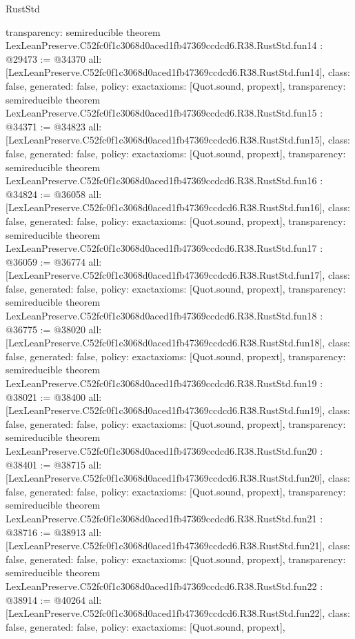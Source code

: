 \begin{lexlean}{RustStd}
\begin{coremodule}
{  transparency: semireducible
}
theorem LexLeanPreserve.C52fc0f1c3068d0aced1fb47369ccdcd6.R38.RustStd.fun14 : @29473 := @34370 {
  all: [LexLeanPreserve.C52fc0f1c3068d0aced1fb47369ccdcd6.R38.RustStd.fun14],
  class: false,
  generated: false,
  policy: exact{axioms: [Quot.sound, propext]},
  transparency: semireducible
}
theorem LexLeanPreserve.C52fc0f1c3068d0aced1fb47369ccdcd6.R38.RustStd.fun15 : @34371 := @34823 {
  all: [LexLeanPreserve.C52fc0f1c3068d0aced1fb47369ccdcd6.R38.RustStd.fun15],
  class: false,
  generated: false,
  policy: exact{axioms: [Quot.sound, propext]},
  transparency: semireducible
}
theorem LexLeanPreserve.C52fc0f1c3068d0aced1fb47369ccdcd6.R38.RustStd.fun16 : @34824 := @36058 {
  all: [LexLeanPreserve.C52fc0f1c3068d0aced1fb47369ccdcd6.R38.RustStd.fun16],
  class: false,
  generated: false,
  policy: exact{axioms: [Quot.sound, propext]},
  transparency: semireducible
}
theorem LexLeanPreserve.C52fc0f1c3068d0aced1fb47369ccdcd6.R38.RustStd.fun17 : @36059 := @36774 {
  all: [LexLeanPreserve.C52fc0f1c3068d0aced1fb47369ccdcd6.R38.RustStd.fun17],
  class: false,
  generated: false,
  policy: exact{axioms: [Quot.sound, propext]},
  transparency: semireducible
}
theorem LexLeanPreserve.C52fc0f1c3068d0aced1fb47369ccdcd6.R38.RustStd.fun18 : @36775 := @38020 {
  all: [LexLeanPreserve.C52fc0f1c3068d0aced1fb47369ccdcd6.R38.RustStd.fun18],
  class: false,
  generated: false,
  policy: exact{axioms: [Quot.sound, propext]},
  transparency: semireducible
}
theorem LexLeanPreserve.C52fc0f1c3068d0aced1fb47369ccdcd6.R38.RustStd.fun19 : @38021 := @38400 {
  all: [LexLeanPreserve.C52fc0f1c3068d0aced1fb47369ccdcd6.R38.RustStd.fun19],
  class: false,
  generated: false,
  policy: exact{axioms: [Quot.sound, propext]},
  transparency: semireducible
}
theorem LexLeanPreserve.C52fc0f1c3068d0aced1fb47369ccdcd6.R38.RustStd.fun20 : @38401 := @38715 {
  all: [LexLeanPreserve.C52fc0f1c3068d0aced1fb47369ccdcd6.R38.RustStd.fun20],
  class: false,
  generated: false,
  policy: exact{axioms: [Quot.sound, propext]},
  transparency: semireducible
}
theorem LexLeanPreserve.C52fc0f1c3068d0aced1fb47369ccdcd6.R38.RustStd.fun21 : @38716 := @38913 {
  all: [LexLeanPreserve.C52fc0f1c3068d0aced1fb47369ccdcd6.R38.RustStd.fun21],
  class: false,
  generated: false,
  policy: exact{axioms: [Quot.sound, propext]},
  transparency: semireducible
}
theorem LexLeanPreserve.C52fc0f1c3068d0aced1fb47369ccdcd6.R38.RustStd.fun22 : @38914 := @40264 {
  all: [LexLeanPreserve.C52fc0f1c3068d0aced1fb47369ccdcd6.R38.RustStd.fun22],
  class: false,
  generated: false,
  policy: exact{axioms: [Quot.sound, propext]},
}
\end{coremodule}
\end{lexlean}
